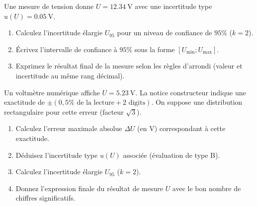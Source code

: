 \documentclass[11pt]{article}
\begin{document}
\begin{exercice}
Une mesure de tension donne $U = \SI{12,34}{\volt}$ avec une incertitude type $u(U) = \SI{0,05}{\volt}$.
\begin{enumerate}
\item Calculez l'incertitude élargie $U_{95}$ pour un niveau de confiance de $95\%$ ($k=2$).
\item Écrivez l'intervalle de confiance à $95\%$ sous la forme $[U_{\text{min}} ; U_{\text{max}}]$.
\item Exprimez le résultat final de la mesure selon les règles d'arrondi (valeur et incertitude au même rang décimal).
\end{enumerate}
\end{exercice}

\begin{exercice}
Un voltmètre numérique affiche $U = \SI{5,23}{\volt}$. La notice constructeur indique une exactitude de $\pm (0,5\% \text{ de la lecture} + 2 \text{ digits})$. On suppose une distribution rectangulaire pour cette erreur (facteur $\sqrt{3}$).
\begin{enumerate}
\item Calculez l'erreur maximale absolue $\Delta U$ (en V) correspondant à cette exactitude.
\item Déduisez l'incertitude type $u(U)$ associée (évaluation de type B).
\item Calculez l'incertitude élargie $U_{95}$ ($k=2$).
\item Donnez l'expression finale du résultat de mesure $U$ avec le bon nombre de chiffres significatifs.
\end{enumerate}
\end{exercice}
\end{document}
